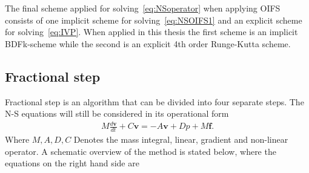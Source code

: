 The final scheme applied for solving~\ref{eq:NSoperator} when applying OIFS consists of one implicit scheme for 
solving~\ref{eq:NSOIFS1} and an explicit scheme for solving~\ref{eq:IVP}. When applied in this thesis the 
first scheme is an implicit BDFk-scheme while the second is an explicit 4th order Runge-Kutta scheme. 


\subsection{Fractional step} 
\label{fracstep}

Fractional step is an algorithm that can be divided into four separate steps. The N-S equations will still 
be considered in its operational form 
\begin{align}
    M\frac{d \mathbf{v}}{dt} + C\mathbf{v} = -A\mathbf{v} +D p +M\mathbf{f}.
    \label{eq:NSfracstep}
\end{align}
%
Where $M, A,D,C$ Denotes the mass integral, linear, gradient and non-linear operator. 
A schematic overview of the method is stated below, where the equations on the right hand side are 

